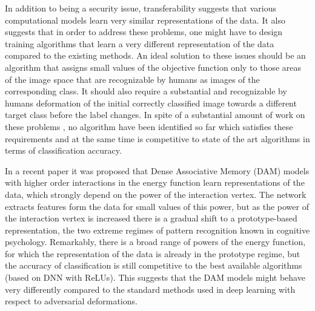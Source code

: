 \documentclass[12pt]{article} %
\begin{document}
In addition to being a security issue, transferability suggests that various computational models learn very similar representations of the data. It also suggests that in order to address these problems, one might have to design training algorithms that learn a very different representation of the data compared to the existing methods. An ideal solution to these issues should be an algorithm that assigns small values of the objective function only to those areas of the image space that are recognizable by humans as images of the corresponding class. It should also require a substantial and recognizable by humans deformation of the initial correctly classified image towards a different target class before the label changes. In spite of a substantial amount of work on these problems \cite{Miyato,non-linearity,strong adversary,Nokland,Random Feature Null}, no algorithm have been identified so far which satisfies these requirements and at the same time is competitive to state of the art algorithms in terms of classification accuracy. 

In a recent paper \cite{Krotov Hopfield} it was proposed that Dense Associative Memory (DAM) models with higher order interactions in the energy function learn representations of the data, which strongly depend on the power of the interaction vertex. The network extracts features form the data for small values of this power, but as the power of the interaction vertex is increased there is a gradual shift to a prototype-based representation, the two extreme regimes of pattern recognition known in cognitive psychology. Remarkably, there is a broad range of powers of the energy function, for which the representation of the data is already in the prototype regime, but the accuracy of classification is still competitive to the best available algorithms (based on DNN with ReLUs). This suggests that the DAM models might behave very differently compared to the standard methods used in deep learning with respect to adversarial deformations. 
\end{document}
